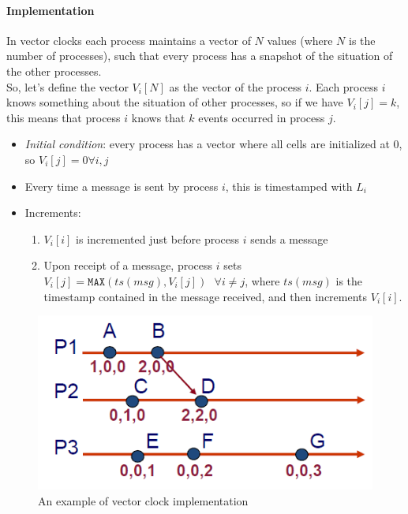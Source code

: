 \paragraph{Implementation}

In vector clocks each process maintains a vector of $N$ values (where $N$ is the number of processes), such that every process has a snapshot of the situation of the other processes.\\
So, let's define the vector $V_i[N]$ as the vector of the process $i$. Each process $i$ knows something about the situation of other processes, so if we have $V_i[j] = k$, this means that process $i$ knows that $k$ events occurred in process $j$.

\begin{itemize}
    \item \textit{Initial condition}: every process has a vector where all cells are initialized at 0, so $V_i[j] = 0 \forall i, j$
    \item Every time a message is sent by process $i$, this is timestamped with $L_i$
    \item Increments:
    \begin{enumerate}
        \item $V_i[i]$ is incremented just before process $i$ sends a message
        \item Upon receipt of a message, process $i$ sets $V_i[j] = \texttt{MAX}(ts(msg), V_i[j]) \texttt{  } \forall i \neq j$, where $ts(msg)$ is the timestamp contained in the message received, and then increments $V_i[i]$.
    \end{enumerate}
\end{itemize}

\begin{figure}[h]
    \caption{An example of vector clock implementation}
    \includegraphics[scale=0.5]{src/images/synchronization/vector-clock.png}
    \centering
\end{figure}

